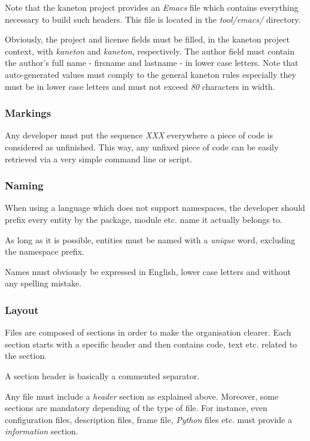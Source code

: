 Note that the kaneton project provides an \textit{Emacs} file which contains
everything necessary to build such headers. This file is located in the
\textit{tool/emacs/} directory.

Obviously, the project and license fields must be filled, in the kaneton
project context, with \textit{kaneton} and \textit{kaneton}, respectively. The
author field must contain the author's full name - firsname and lastname -
in lower case letters. Note that auto-generated values must comply to
the general kaneton rules especially they must be in lower case letters and
must not exceed \textit{80} characters in width.


\subsubsection{Markings}

Any developer must put the sequence \textit{XXX} everywhere a piece of code
is considered as unfinished. This way, any unfixed piece of code can be
easily retrieved via a very simple command line or script.


\subsubsection{Naming}

When using a language which does not support namespaces, the developer should
prefix every entity by the package, module etc. name it actually belongs to.

As long as it is possible, entities must be named with a \textit{unique}
word, excluding the namespace prefix.

Names must obviously be expressed in English, lower case letters and
without any spelling mistake.


\subsubsection{Layout}

Files are composed of sections in order to make the organisation clearer.
Each section starts with a specific header and then contains code, text etc.
related to the section.

A section header is basically a commented separator.

Any file must include a \textit{header} section as explained above. Moreover,
some sections are mandatory depending of the type of file. For instance,
even configuration files, description files, frame file, \textit{Python}
files etc. must provide a \textit{information} section.

